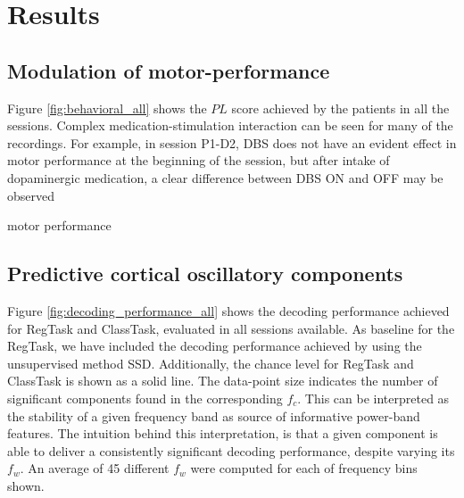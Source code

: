\documentclass[10pt,a4paper, twocolumn]{article}
\newcommand{\regtask}{RegTask\xspace}
\newcommand{\classtask}{ClassTask\xspace}
\begin{document}
\section{Results}
\subsection{Modulation of motor-performance}
Figure \ref{fig:behavioral_all} shows the $PL$ score achieved by the patients in all the sessions. Complex medication-stimulation interaction can be seen for many of the recordings. For example, in session P1-D2, DBS does not have an evident effect in motor performance at the beginning of the session, but after intake of dopaminergic medication, a clear difference between DBS ON and OFF may be observed


%	

\begin{table}
	\centering
	\small
	
	\caption{motor performance}
\end{table}




\subsection{Predictive cortical oscillatory components}


Figure \ref{fig:decoding_performance_all} shows the decoding performance achieved for \regtask and  \classtask, evaluated in all sessions available. As baseline for the \regtask, we have included the decoding performance achieved by using the unsupervised method SSD. Additionally, the chance level for \regtask and  \classtask is shown as a solid line. The data-point size indicates the number of significant components found in the corresponding $f_c$. This can be interpreted as the  stability of a given frequency band as source of informative power-band features. The intuition behind this interpretation, is that a given component is able to deliver a consistently significant decoding performance, despite varying its $f_w$. An average of 45 different $f_w$ were computed for each of frequency bins shown.
\end{document}
